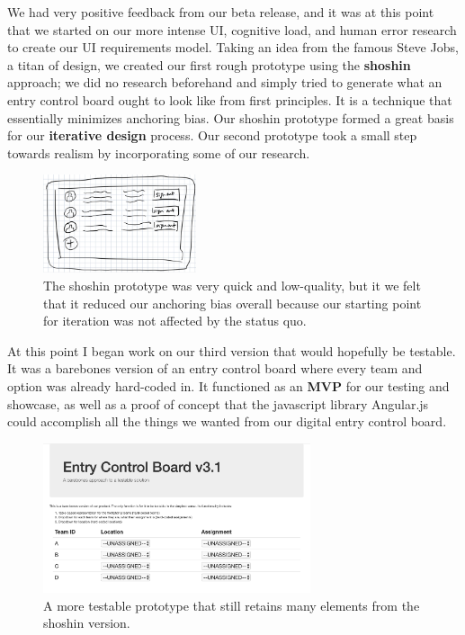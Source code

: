 \documentclass[a4paper,12pt]{article}
\begin{document}
We had very positive feedback from our beta release, and it was at this point that we started on our more intense UI, cognitive load, and human error research to create our UI requirements model. Taking an idea from the famous Steve Jobs, a titan of design, we created our first rough prototype using the \textbf{shoshin} approach; we did no research beforehand and simply tried to generate what an entry control board ought to look like from first principles. It is a technique that essentially minimizes anchoring bias. Our shoshin prototype formed a great basis for our \textbf{iterative design} process. Our second prototype took a small step towards realism by incorporating some of our research.

\begin{figure}[H]
\centering
\includegraphics[width=0.4\textwidth]{img/image017.png}
\caption{The shoshin prototype was very quick and low-quality, but it we felt that it reduced our anchoring bias overall because our starting point for iteration was not affected by the status quo.}
\label{}
\end{figure}

At this point I began work on our third version that would hopefully be testable. It was a barebones version of an entry control board where every team and option was already hard-coded in. It functioned as an \textbf{MVP} for our testing and showcase, as well as a proof of concept that the javascript library Angular.js could accomplish all the things we wanted from our digital entry control board.

\begin{figure}[H]
\centering
\includegraphics[width=0.7\textwidth]{img/image018.png}
\caption{A more testable prototype that still retains many elements from the shoshin version.}
\label{}
\end{figure}
\end{document}
